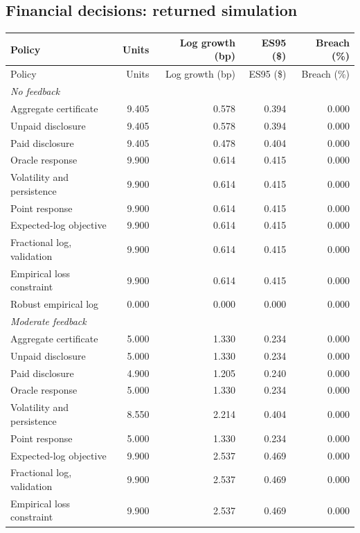 \subsection*{Financial decisions: returned simulation}
{\footnotesize\setlength{\tabcolsep}{4pt}\renewcommand{\arraystretch}{0.9}
\begin{longtable}{p{}rrrr}
\toprule
Policy & Units & Log growth (bp) & ES95 (\$) & Breach (\%)\\
\midrule
\endfirsthead
\toprule
Policy & Units & Log growth (bp) & ES95 (\$) & Breach (\%)\\
\midrule
\endhead
\multicolumn{5}{l}{\textit{No feedback}}\\
Aggregate certificate & 9.405 & 0.578 & 0.394 & 0.000\\
Unpaid disclosure & 9.405 & 0.578 & 0.394 & 0.000\\
Paid disclosure & 9.405 & 0.478 & 0.404 & 0.000\\
Oracle response & 9.900 & 0.614 & 0.415 & 0.000\\
Volatility and persistence & 9.900 & 0.614 & 0.415 & 0.000\\
Point response & 9.900 & 0.614 & 0.415 & 0.000\\
Expected-log objective & 9.900 & 0.614 & 0.415 & 0.000\\
Fractional log, validation & 9.900 & 0.614 & 0.415 & 0.000\\
Empirical loss constraint & 9.900 & 0.614 & 0.415 & 0.000\\
Robust empirical log & 0.000 & 0.000 & 0.000 & 0.000\\
\midrule
\multicolumn{5}{l}{\textit{Moderate feedback}}\\
Aggregate certificate & 5.000 & 1.330 & 0.234 & 0.000\\
Unpaid disclosure & 5.000 & 1.330 & 0.234 & 0.000\\
Paid disclosure & 4.900 & 1.205 & 0.240 & 0.000\\
Oracle response & 5.000 & 1.330 & 0.234 & 0.000\\
Volatility and persistence & 8.550 & 2.214 & 0.404 & 0.000\\
Point response & 5.000 & 1.330 & 0.234 & 0.000\\
Expected-log objective & 9.900 & 2.537 & 0.469 & 0.000\\
Fractional log, validation & 9.900 & 2.537 & 0.469 & 0.000\\
Empirical loss constraint & 9.900 & 2.537 & 0.469 & 0.000\\

\end{longtable}}
